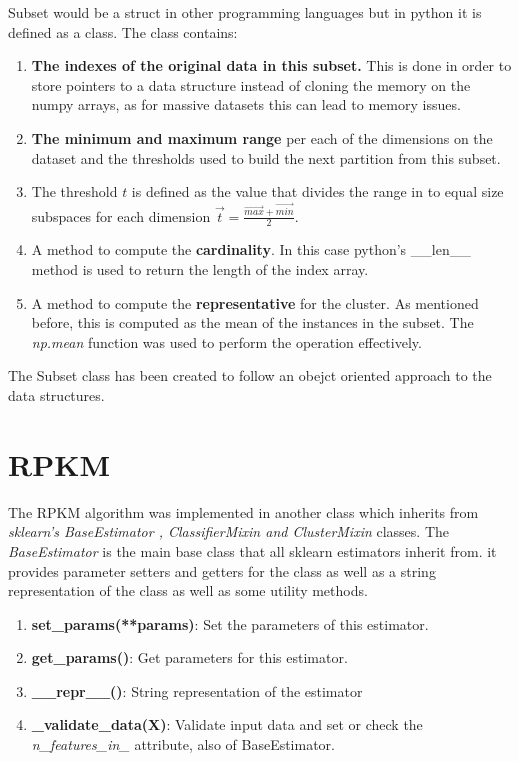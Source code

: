 Subset would be a struct in other programming languages but in python it is defined as a class. The class contains:

\begin{enumerate}
    \item \textbf{The indexes of the original data in this subset.} This is done in order to store pointers to a data structure instead of cloning the memory on the numpy arrays, as for massive datasets this can lead to memory issues. 
    \item \textbf{The minimum and maximum range} per each of the dimensions on the dataset and the thresholds used to build the next partition from this subset. 
    \item The threshold $t$ is defined as the value that divides the range in to equal size subspaces for each dimension $\overrightarrow{t} = \frac{\overrightarrow{max} + \overrightarrow{min}}{2}$. 
    \item A method to compute the \textbf{cardinality}. In this case python's \_\_len\_\_ method is used to return the length of the index array.
    \item A method to compute the \textbf{representative} for the cluster. As mentioned before, this is computed as the mean of the instances in the subset. The \textit{np.mean} function was used to perform the operation effectively.
\end{enumerate}

The Subset class has been created to follow an obejct oriented approach to the data structures.

\section{RPKM}

The RPKM algorithm was implemented in another class which inherits from \textit{sklearn's BaseEstimator , ClassifierMixin and ClusterMixin} classes. The \textit{BaseEstimator} is the main base class that all sklearn estimators inherit from. it provides parameter setters and getters for the class as well as a string representation of the class as well as some utility methods.

\begin{enumerate}
    \item \textbf{set\_params(**params)}: Set the parameters of this estimator.
    \item \textbf{get\_params()}: Get parameters for this estimator.
    \item \textbf{\_\_repr\_\_()}: String representation of the estimator
    \item \textbf{\_validate\_data(X)}: Validate input data and set or check the \textit{n\_features\_in\_} attribute, also of BaseEstimator.
\end{enumerate}

